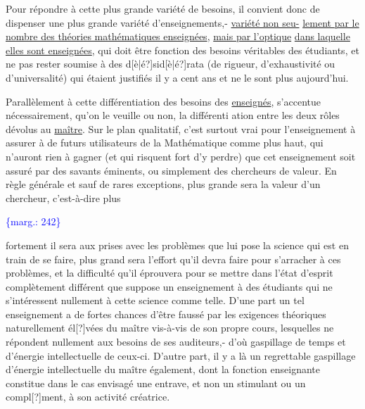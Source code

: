 \documentclass[11pt]{article}
\newcommand{\scanpage}[1]{\par\bigskip\noindent{\small\sffamily[scan #1]}\par}
\newcommand{\mspage}[1]{{\small\sffamily[p.\,#1]}}
\let\over\relax
\newcommand{\over}[2]{\textcolor{gray}{#1}\textcolor{blue}{\ensuremath{^{\!\nearrow}}#2}}
\newcommand{\margin}[1]{\textcolor{blue}{\{\textsf{marg.:} #1\}}}
\newcommand{\uline}[1]{\underline{#1}}
\newcommand{\unsure}[1]{[#1?]}
\begin{document}
Pour répondre à cette plus grande variété de besoins, il convient
donc de dispenser une plus grande variété d'enseignements,- \uline{variété non seu-}%
\uline{lement par le nombre des théories mathématiques enseignées}, \uline{mais par l'optique}
\uline{dans laquelle elles sont enseignées}, qui doit être fonction des besoins
véritables des étudiants, et ne pas rester soumise à des d\unsure{è|é}sid\unsure{è|é}rata (de
rigueur, d'exhaustivité ou d'universalité) qui étaient justifiés il y a
cent ans et ne le sont plus aujourd'hui.

Parallèlement à cette différentiation des besoins des \uline{enseignés},
s'accentue nécessairement, qu'on le veuille ou non, la différenti ation
entre les deux rôles dévolus au \uline{maître}. Sur le plan qualitatif, c'est
surtout vrai pour l'enseignement à assurer à de futurs utilisateurs de la
Mathématique comme plus haut, qui n'auront rien à gagner (et qui risquent
fort d'y perdre) que cet enseignement soit assuré par des savants éminents,
ou simplement des chercheurs de valeur. En règle générale et sauf de rares
exceptions, plus grande sera la valeur d'un chercheur, c'est-à-dire plus

\margin{242}

\clearpage
\scanpage{119/243}
\mspage{3}

fortement il sera aux prises avec les problèmes que lui pose la science qui
est en train de se faire, plus grand sera l'effort qu'il devra faire pour
s'arracher à ces problèmes, et la difficulté qu'il éprouvera pour se mettre
dans l'état d'esprit complètement différent que suppose un enseignement à
des étudiants qui ne s'intéressent nullement à cette science comme telle.
D'une part un tel enseignement a de fortes chances d'être faussé par les
exigences théoriques naturellement él\unsure{\over{e}{è}}vées du maître vis-à-vis de son propre
cours, lesquelles ne répondent nullement aux besoins de ses auditeurs,- d'où
gaspillage de temps et d'énergie intellectuelle de ceux-ci. D'autre part, il
y a là un regrettable gaspillage d'énergie intellectuelle du maître également,
dont la fonction enseignante constitue dans le cas envisagé une entrave, et
non un stimulant ou un compl\unsure{\over{e}{é}}ment, à son activité créatrice.
\end{document}
